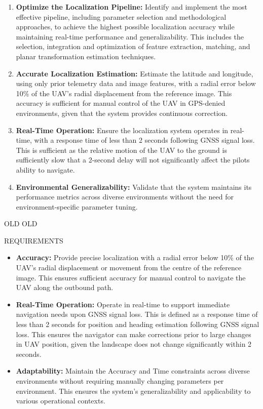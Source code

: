 \begin{enumerate}
    \item \textbf{Optimize the Localization Pipeline:} Identify and implement the most effective pipeline, including parameter selection and methodological approaches, to achieve the highest possible localization accuracy while maintaining real-time performance and generalizability. This includes the selection, integration and optimization of feature extraction, matching, and planar transformation estimation techniques.
    \item \textbf{Accurate Localization Estimation:} Estimate the latitude and longitude, using only prior telemetry data and image features, with a radial error below 10\% of the UAV's radial displacement from the reference image. This accuracy is sufficient for manual control of the UAV in GPS-denied environments, given that the system provides continuous correction.
    \item \textbf{Real-Time Operation:} Ensure the localization system operates in real-time, with a response time of less than 2 seconds following GNSS signal loss. This is sufficient as the relative motion of the UAV to the ground is sufficiently slow that a 2-second delay will not significantly affect the pilots ability to navigate.
    \item \textbf{Environmental Generalizability:} Validate that the system maintains its performance metrics across diverse environments without the need for environment-specific parameter tuning.
\end{enumerate}
OLD
OLD

REQUIREMENTS
\begin{itemize} 
\item \textbf{Accuracy:} Provide precise localization with a radial error below 10\% of the UAV's radial displacement or movement from the centre of the reference image. This ensures sufficient accuracy for manual control to navigate the UAV along the outbound path.
\item \textbf{Real-Time Operation:} Operate in real-time to support immediate navigation needs upon GNSS signal loss. This is defined as a response time of less than 2 seconds for position and heading estimation following GNSS signal loss. This ensures the navigator can make corrections prior to large changes in UAV position, given the landscape does not change significantly within 2 seconds.
\item \textbf{Adaptability:} Maintain the Accuracy and Time constraints across diverse environments without requiring manually changing parameters per environment. This ensures the system's generalizability and applicability to various operational contexts. 
\end{itemize}


